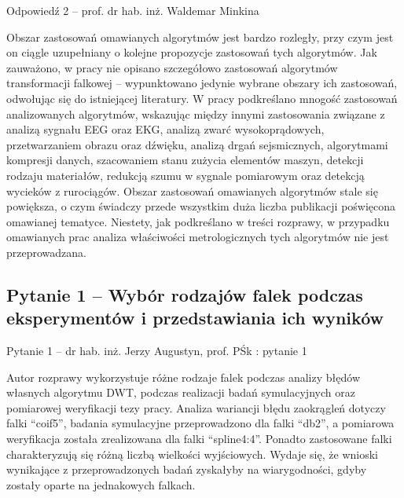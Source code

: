 \documentclass[12pt, polish, aspectratio = 169]{slides}
\begin{document}
\begin{frame}[allowframebreaks]{Odpowiedź 2 -- prof. dr hab. inż. Waldemar Minkina}\small
\begin{justify}
Obszar zastosowań omawianych algorytmów jest bardzo rozległy, przy czym jest on ciągle uzupełniany o kolejne propozycje zastosowań tych algorytmów. Jak zauważono, w pracy nie opisano szczegółowo zastosowań algorytmów transformacji falkowej -- wypunktowano jedynie wybrane obszary ich zastosowań, odwołując się do istniejącej literatury. W pracy podkreślano mnogość zastosowań analizowanych algorytmów, wskazując między innymi zastosowania związane z analizą sygnału EEG oraz EKG, analizą zwarć wysokoprądowych, przetwarzaniem obrazu oraz dźwięku, analizą drgań sejsmicznych, algorytmami kompresji danych, szacowaniem stanu zużycia elementów maszyn, detekcji rodzaju materiałów, redukcją szumu w sygnale pomiarowym oraz detekcją wycieków z rurociągów. Obszar zastosowań omawianych algorytmów stale się powiększa, o czym świadczy przede wszystkim duża liczba publikacji poświęcona omawianej tematyce. Niestety, jak podkreślano w treści rozprawy, w przypadku omawianych prac analiza właściwości metrologicznych tych algorytmów nie jest przeprowadzana.
\end{justify}
\end{frame}


\subsection{Pytanie 1 -- Wybór rodzajów falek podczas eksperymentów i przedstawiania ich wyników}

\begin{frame}{Pytanie 1 -- dr hab. inż. Jerzy Augustyn, prof. PŚk : pytanie 1}\large
\begin{justify}
Autor rozprawy wykorzystuje różne rodzaje falek podczas analizy błędów własnych algorytmu DWT, podczas realizacji badań symulacyjnych oraz pomiarowej weryfikacji tezy pracy. Analiza wariancji błędu zaokrągleń dotyczy falki \enquote{coif5}, badania symulacyjne przeprowadzono dla falki \enquote{db2}, a pomiarowa weryfikacja została zrealizowana dla falki \enquote{spline4:4}. Ponadto zastosowane falki charakteryzują się różną liczbą wielkości wyjściowych. Wydaje się, że wnioski wynikające z przeprowadzonych badań zyskałyby na wiarygodności, gdyby zostały oparte na jednakowych falkach.
\end{justify}
\end{frame}
\end{document}
